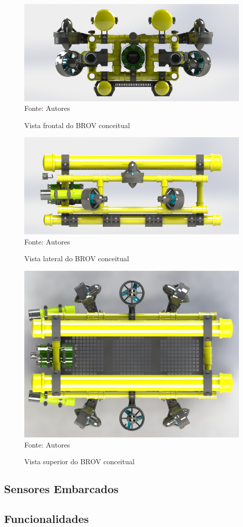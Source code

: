 \begin{figure}[h]
	\centering
	\caption{Vista frontal do BROV conceitual}
	\label{fig:vista-frontal}
	\includegraphics[width=0.7\linewidth]{images/vista-frontal}\\
	\footnotesize Fonte: Autores
\end{figure}

\begin{figure}[h]
	\centering
	\caption{Vista lateral do BROV conceitual}
	\label{fig:vista-lateral}
	\includegraphics[width=0.7\linewidth]{images/vista-lateral}\\
	\footnotesize Fonte: Autores
\end{figure}

\begin{figure}[h]
	\centering
	\caption{Vista superior do BROV conceitual}
	\label{fig:vista-superior}
	\includegraphics[width=0.7\linewidth]{images/vista-superior-cut}\\
	\footnotesize Fonte: Autores
\end{figure}

\subsection{Sensores Embarcados}
\label{subsec:sensores-embarcados}

\subsection{Funcionalidades}
\label{subsec:funcionalidades}